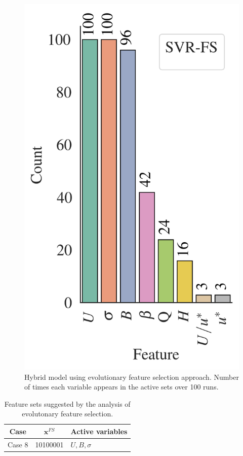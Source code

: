 \documentclass[a4paper,12pt, english]{article}
\newcommand{\x}{\mathbf{x}}
\begin{document}
\begin{figure}[!]
    \includegraphics[height=0.35\textheight]{./results/eml____300dpi_active_features_distribution_svr_fs__count}
    \caption{\label{fig:eml____300dpi_active_features_distribution__count}
    Hybrid model using evolutionary feature selection approach.
    Number of times each variable appears in the active sets  over 100 runs.}
\end{figure}


\begin{table}
    \centering
    \caption{ \label{tab:cases-features-fs} Feature sets suggested by the analysis of evolutonary feature selection.
    }
    \begin{tabular}{ccl}
    \hline
        Case   & $\x^{FS}$ & Active variables                             \\ \hline
        Case 8 &  10100001  & $U ,     B,                      \sigma$    \\ \hline
\end{tabular}
\end{table}
\end{document}
